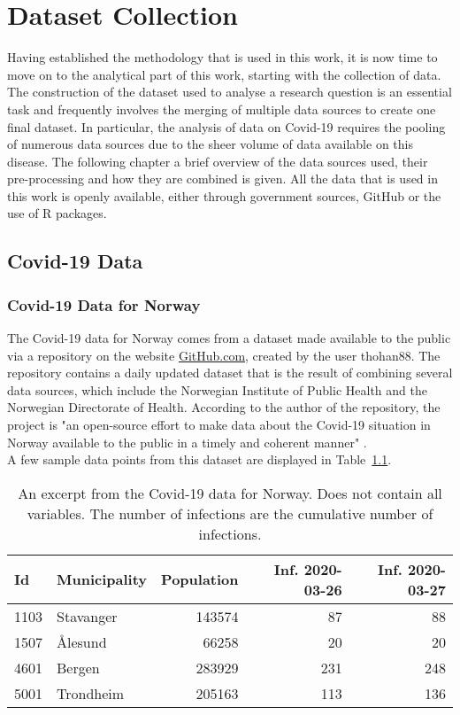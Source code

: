%
\chapter{Dataset Collection}
Having established the methodology that is used in this work, it is now time to move on to the analytical part of this work, starting with the collection of data. The construction of the dataset used to analyse a research question is an essential task and frequently involves the merging of multiple data sources to create one final dataset. In particular, the analysis of data on Covid-19 requires the pooling of numerous data sources due to the sheer volume of data available on this disease. The following chapter a brief overview of the data sources used, their pre-processing and how they are combined is given. All the data that is used in this work is openly available, either through government sources, GitHub or the use of R packages.
\label{sec:datacollection}
\clearpage
\section{Covid-19 Data}
\subsection{Covid-19 Data for Norway}
The Covid-19 data for Norway comes from a dataset made available to the public via a repository on the website \href{https://www.github.com}{GitHub.com}, created by the user thohan88. The repository contains a daily updated dataset that is the result of combining several data sources, which include the Norwegian Institute of Public Health and the Norwegian Directorate of Health. According to the author of the repository, the project is "an open-source effort to make data about the Covid-19 situation in Norway available to the public in a timely and coherent manner" \autocite[][]{thohan88}. \\
A few sample data points from this dataset are displayed in Table~\ref{datasetNorge}.\\
\begin{table}[H] 
\caption{An excerpt from the Covid-19 data for Norway. Does not contain all variables. The number of infections are the cumulative number of infections. \label{datasetNorge}}
\begin{tabular}{l l r r r}
\toprule
\textbf{Id}	& \textbf{Municipality}	& \textbf{Population}	& \textbf{Inf. 2020-03-26}	& \textbf{Inf. 2020-03-27}\\
\midrule
1103 & Stavanger & 143574 & 87 & 88 \\
1507 & Ålesund & 66258 & 20 & 20 \\
4601 & Bergen & 283929 & 231 & 248 \\
5001 & Trondheim & 205163 & 113 & 136 \\
\bottomrule
\end{tabular}
\end{table}

